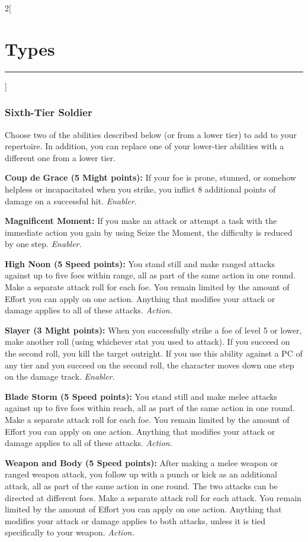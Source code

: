 \documentclass[a4paper,10pt,final]{book}
\newcommand{\HRule}{\rule{\linewidth}{0.5mm}} %
\newcommand{\newSection}[1]{\section*{#1} \addcontentsline{toc}{section}{#1} \label{sec:#1} \HRule}
\newcommand{\itemAbility}[2]{\textcolor{25gray}{\textbullet\textbf{ #1:}} {#2}\par}
\newcommand{\enabler}{\textit{ Enabler.}}
\newcommand{\action}{\textit{ Action.}}
\newenvironment{docsection}[1]
{
  \begin{multicols*}{2}[\newSection{#1}]
}
{
  \end{multicols*}
  \newpage
}
\begin{document}
\begin{docsection}{Types}
\subsubsection*{Sixth-Tier Soldier}
\label{subsub:soldierSixthTier}
Choose two of the abilities described below (or from a lower tier) to add to your repertoire. In addition, you can replace one of your lower-tier abilities with a different one from a lower tier.\par
\itemAbility{Coup de Grace (5 Might points)}{If your
foe is prone, stunned, or somehow helpless
or incapacitated when you strike, you
inflict 8 additional points of damage on a
successful hit.\enabler}
\itemAbility{Magnificent Moment}{If you make an
attack or attempt a task with the immediate
action you gain by using Seize the Moment,
the difficulty is reduced by one step.\enabler}
\itemAbility{High Noon (5 Speed points)}{You
stand still and make ranged attacks against
up to five foes within range, all as part
of the same action in one round. Make a
separate attack roll for each foe. You remain
limited by the amount of Effort you can
apply on one action. Anything that modifies
your attack or damage applies to all of these
attacks.\action}
\itemAbility{Slayer (3 Might points)}{When you
successfully strike a foe of level 5 or lower,
make another roll (using whichever stat
you used to attack). If you succeed on the
second roll, you kill the target outright. If
you use this ability against a PC of any tier
and you succeed on the second roll, the
character moves down one step on the
damage track.\enabler}
\itemAbility{Blade Storm (5 Speed points)}{You stand
still and make melee attacks against up
to five foes within reach, all as part of the
same action in one round. Make a separate
attack roll for each foe. You remain limited
by the amount of Effort you can apply on
one action. Anything that modifies your
attack or damage applies to all of these
attacks.\action}
\itemAbility{Weapon and Body (5 Speed points)}{After making a melee weapon or ranged
weapon attack, you follow up with a punch
or kick as an additional attack, all as part
of the same action in one round. The two
attacks can be directed at different foes. Make a separate attack roll for each attack.
You remain limited by the amount of Effort
you can apply on one action. Anything that
modifies your attack or damage applies to
both attacks, unless it is tied specifically to
your weapon.\action}




\end{docsection}
\end{document}
